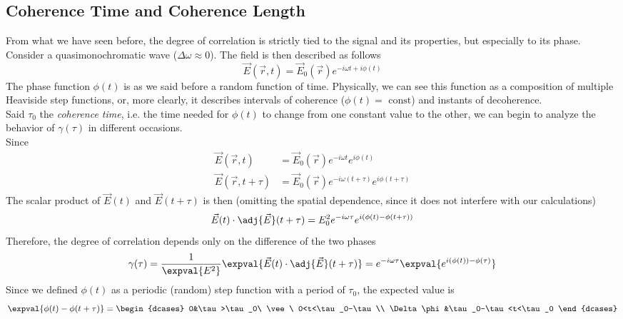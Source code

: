\documentclass[../electromagnetism.tex]{subfiles}
\begin{document}
\subsection{Coherence Time and Coherence Length}
From what we have seen before, the degree of correlation is strictly tied to the signal and its properties, but especially to its phase.\\
Consider a quasimonochromatic wave ($\Delta\omega\approx0$). The field is then described as follows
\begin{equation}
	\vec{E}(\vec{r},t)=\vec{E}_0(\vec{r})e^{-i\omega t+i\phi(t)}
	\label{eq:quasimonochromaticwave.ctm}
\end{equation}
The phase function $\phi(t)$ is as we said before a random function of time. Physically, we can see this function as a composition of multiple Heaviside step functions, or, more clearly, it describes intervals of coherence ($\phi(t)=\text{ const}$) and instants of decoherence.\\
Said $\tau_0$ the \textit{coherence time}, i.e. the time needed for $\phi(t)$ to change from one constant value to the other, we can begin to analyze the behavior of $\gamma(\tau)$ in different occasions.\\
Since
\begin{equation*}
	\begin{aligned}
		\vec{E}(\vec{r},t)&= \vec{E}_0(\vec{r})e^{-i\omega t}e^{i\phi(t)}\\
		\vec{E}(\vec{r},t+\tau)&= \vec{E}_0(\vec{r})e^{-i\omega(t+\tau)}e^{i\phi(t+\tau)}
	\end{aligned}
\end{equation*}
The scalar product of $\vec{E}(t)$ and $\vec{E}(t+\tau)$ is then (omitting the spatial dependence, since it does not interfere with our calculations)
\begin{equation*}
	\vec{E}(t)\cdot\adj{\vec{E}}(t+\tau)=E_0^2e^{-i\omega\tau}e^{i\left( \phi(t)-\phi(t+\tau) \right)}
\end{equation*}
Therefore, the degree of correlation depends only on the difference of the two phases
\begin{equation*}
	\gamma(\tau)=\frac{1}{\expval{E^2}}\expval{\vec{E}(t)\cdot\adj{\vec{E}}(t+\tau)}=e^{-i\omega\tau}\expval{e^{i(\phi(t))-\phi(\tau)}}
\end{equation*}
Since we defined $\phi(t)$ as a periodic (random) step function with a period of $\tau_0$, the expected value is
\begin{equation}
	\expval{\phi(t)-\phi(t+\tau)}=\begin{dcases}
		0&\tau>\tau_0\ \vee\ 0<t<\tau_0-\tau\\
		\Delta\phi&\tau_0-\tau<t<\tau_0
	\end{dcases}
	\label{eq:expvalphase.ctm}
\end{equation}
\end{document}
